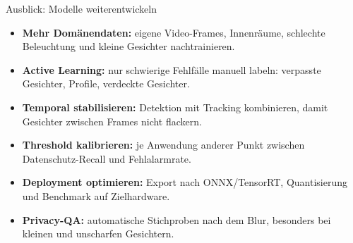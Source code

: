 \begin{frame}{Ausblick: Modelle weiterentwickeln}
\small
\begin{itemize}\setlength\itemsep{0.25em}
    \item \textbf{Mehr Domänendaten:} eigene Video-Frames, Innenräume, schlechte Beleuchtung und kleine Gesichter nachtrainieren.
    \item \textbf{Active Learning:} nur schwierige Fehlfälle manuell labeln: verpasste Gesichter, Profile, verdeckte Gesichter.
    \item \textbf{Temporal stabilisieren:} Detektion mit Tracking kombinieren, damit Gesichter zwischen Frames nicht flackern.
    \item \textbf{Threshold kalibrieren:} je Anwendung anderer Punkt zwischen Datenschutz-Recall und Fehlalarmrate.
    \item \textbf{Deployment optimieren:} Export nach ONNX/TensorRT, Quantisierung und Benchmark auf Zielhardware.
    \item \textbf{Privacy-QA:} automatische Stichproben nach dem Blur, besonders bei kleinen und unscharfen Gesichtern.
\end{itemize}
\end{frame}

